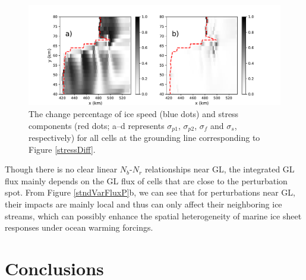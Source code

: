 \documentclass[review,oneside]{igs}
\begin{document}
\begin{figure}
	\centering
	\includegraphics[width=1\linewidth]{figs/stressDiff_velDiff_GL_allPerturb.pdf}
	\caption{The change percentage of ice speed (blue dots) and stress components (red dots; a--d represents $\sigma_{p1}$, $\sigma_{p2}$, $\sigma_{f}$ and $\sigma_{s}$, respectively) for all cells at the grounding line corresponding to Figure \ref{stressDiff}.}
	\label{stressDiff_velDiff}
\end{figure}



Though there is no clear linear $N_b$-$N_r$ relationships near GL, the integrated GL flux mainly depends on the GL flux of cells that are close to the perturbation spot. From Figure \ref{stndVarFluxP}b, we can see that for perturbations near GL, their impacts are mainly local and thus can only affect their neighboring ice streams, which can possibly enhance the spatial heterogeneity of marine ice sheet responses under ocean warming forcings.  


\section{Conclusions}
\end{document}

